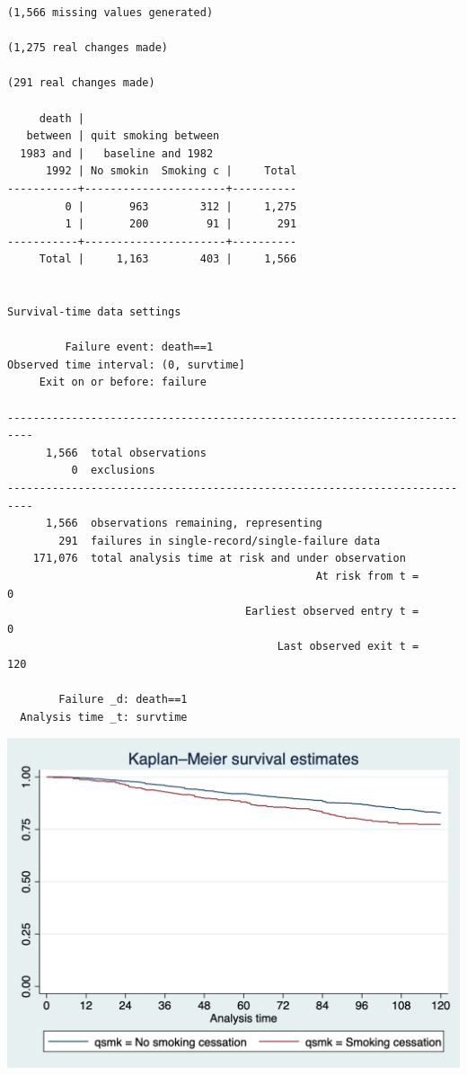 \documentclass[
  10pt,
]{book}
\begin{document}
\begin{verbatim}
(1,566 missing values generated)

(1,275 real changes made)

(291 real changes made)

     death |
   between | quit smoking between
  1983 and |   baseline and 1982
      1992 | No smokin  Smoking c |     Total
-----------+----------------------+----------
         0 |       963        312 |     1,275 
         1 |       200         91 |       291 
-----------+----------------------+----------
     Total |     1,163        403 |     1,566 


Survival-time data settings

         Failure event: death==1
Observed time interval: (0, survtime]
     Exit on or before: failure

--------------------------------------------------------------------------
      1,566  total observations
          0  exclusions
--------------------------------------------------------------------------
      1,566  observations remaining, representing
        291  failures in single-record/single-failure data
    171,076  total analysis time at risk and under observation
                                                At risk from t =         0
                                     Earliest observed entry t =         0
                                          Last observed exit t =       120

        Failure _d: death==1
  Analysis time _t: survtime
\end{verbatim}

\begin{center}\includegraphics[width=0.85\linewidth]{./figs/stata-fig-17-1} \end{center}
\end{document}

